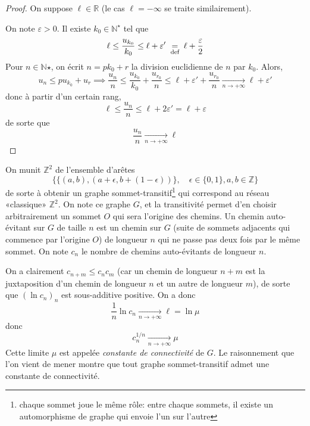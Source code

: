 \begin{proof}
    On suppose $\ell\in\mathbb R$ (le cas $\ell=-\infty$ se traite similairement).

    On note $\varepsilon>0$. Il existe $k_0\in\mathbb N^\star$ tel que \[
        \ell\leq \frac{u_{k_0}}{k_0}\leq \ell+\varepsilon'\;\underset{\text{def}}=\;\ell+\frac\varepsilon2
    \]
    Pour $n\in\mathbb N$$\star$, on écrit $n=pk_0+r$ la division euclidienne de $n$ par $k_0$. Alors, \[
        u_n\leq pu_{k_0}+u_r\implies \frac{u_n}n\leq \frac{u_{k_0}}{k_0}+\frac{u_{r_0}}n\leq \ell+\varepsilon'+\frac{u_{r_0}}n\xrightarrow[n\to+\infty]{}\ell+\varepsilon'
    \]
    donc à partir d'un certain rang, \[
        \ell\leq \frac{u_n}n\leq \ell+2\varepsilon'=\ell+\varepsilon
    \]
    de sorte que \[
        \frac{u_n}n\xrightarrow[n\to+\infty]{}\ell
    \]
\end{proof}

\begin{ex}
    On munit $\mathbb Z^2$ de l'ensemble d'arêtes \[\{\{(a, b), (a+\epsilon, b+(1-\epsilon))\}, \quad \epsilon\in\{0,1\}, a,b\in\mathbb Z \}\] de sorte à obtenir un graphe sommet-transitif\footnote{chaque sommet joue le même rôle: entre chaque sommets, il existe un automorphisme de graphe qui envoie l'un sur l'autre} qui correspond au réseau «classique» $\mathbb Z^2$. On note ce graphe $G$, et la transitivité permet d'en choisir arbitrairement un sommet $O$ qui sera l'origine des chemins. Un chemin auto-évitant sur $G$ de taille $n$ est un chemin sur $G$ (suite de sommets adjacents qui commence par l'origine $O$) de longueur $n$ qui ne passe pas deux fois par le même sommet. On note $c_n$ le nombre de chemins auto-évitants de longueur $n$.

    On a clairement $c_{n+m}\leq c_nc_m$ (car un chemin de longueur $n+m$ est la juxtaposition d'un chemin de longueur $n$ et un autre de longueur $m$), de sorte que $(\ln c_n)_n$ est sous-additive positive. On a donc \[
        \frac1n\ln c_n\xrightarrow[n\to+\infty]{}\ell=\ln\mu
    \]
    donc \[
        c_n^{1/n}\xrightarrow[n\to+\infty]{}\mu
    \]
    Cette limite $\mu$ est appelée \emph{constante de connectivité} de $G$. Le raisonnement que l'on vient de mener montre que tout graphe sommet-transitif admet une constante de connectivité.
\end{ex}

